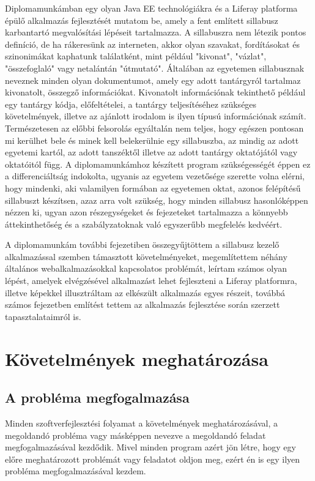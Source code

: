 \documentclass[hidelinks, 12pt, a4paper]{report}
\begin{document}
Diplomamunkámban egy olyan Java EE technológiákra és a Liferay platforma épülő alkalmazás fejlesztését mutatom be, amely a fent említett sillabusz karbantartó megvalósítási lépéseit tartalmazza. A sillabuszra \cite{sillabusz} nem létezik pontos definíció, de ha rákeresünk az interneten, akkor olyan szavakat, fordításokat és szinonimákat kaphatunk találatként, mint például "kivonat", "vázlat", "összefoglaló" vagy netalántán "útmutató". Általában az egyetemen sillabusznak neveznek minden olyan dokumentumot, amely egy adott tantárgyról tartalmaz kivonatolt, összegző információkat. Kivonatolt információnak tekinthető például egy tantárgy kódja, előfeltételei, a tantárgy teljesítéséhez szükséges követelmények, illetve az ajánlott irodalom is ilyen típusú információnak számít. Természetesen az előbbi felsorolás egyáltalán nem teljes, hogy egészen pontosan mi kerülhet bele és minek kell belekerülnie egy sillabuszba, az mindig az adott egyetemi kartól, az adott tanszéktől illetve az adott tantárgy oktatójától vagy oktatóitól függ. A diplomamunkámhoz készített program szükségességét éppen ez a differenciáltság indokolta, ugyanis az egyetem vezetősége szerette volna elérni, hogy mindenki, aki valamilyen formában az egyetemen oktat, azonos felépítésű sillabuszt készítsen, azaz arra volt szükség, hogy minden sillabusz hasonlóképpen nézzen ki, ugyan azon részegységeket és fejezeteket tartalmazza a könnyebb áttekinthetőség és a szabályzatoknak való egyszerűbb megfelelés kedvéért.

A diplomamunkám további fejezetiben összegyűjtöttem a sillabusz kezelő alkalmazással szemben támasztott követelményeket, megemlítettem néhány általános webalkalmazásokkal kapcsolatos problémát, leírtam számos olyan lépést, amelyek elvégzésével alkalmazást lehet fejleszteni a Liferay platformra, illetve képekkel illusztráltam az elkészült alkalmazás egyes részeit, továbbá számos fejezetben említést tettem az alkalmazás fejlesztése során szerzett tapasztalataimról is.

\chapter{Követelmények meghatározása}

\section{A probléma megfogalmazása}

Minden szoftverfejlesztési folyamat a követelmények meghatározásával, a megoldandó probléma vagy másképpen nevezve a megoldandó feladat megfogalmazásával kezdődik. Mivel minden program azért jön létre, hogy egy előre meghatározott problémát vagy feladatot oldjon meg, ezért én is egy ilyen probléma megfogalmazásával kezdem.
\end{document}
